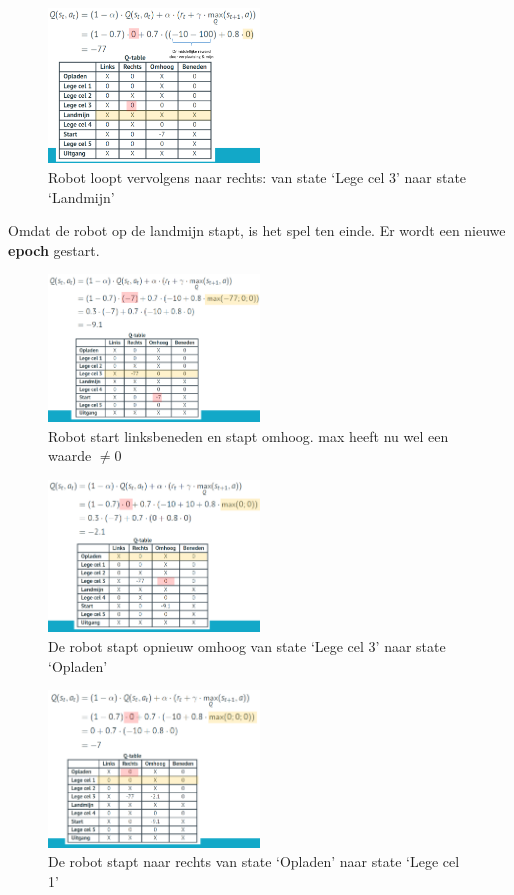 \documentclass{article}
\begin{document}
\begin{figure}[H]
    \centering
    \includegraphics[width=0.5\textwidth]{q-table4.png}
    \caption{Robot loopt vervolgens naar rechts: van state `Lege cel 3' naar state `Landmijn'}
\end{figure}

Omdat de robot op de landmijn stapt, is het spel ten einde. Er wordt een nieuwe \textbf{epoch} gestart.

\begin{figure}[H]
    \centering
    \includegraphics[width=0.5\textwidth]{q-table5.png}
    \caption{Robot start linksbeneden en stapt omhoog. max heeft nu wel een waarde $\neq 0$}
\end{figure}

\begin{figure}[H]
    \centering
    \includegraphics[width=0.5\textwidth]{q-table6.png}
    \caption{De robot stapt opnieuw omhoog van state `Lege cel 3' naar state `Opladen'}
\end{figure}

\begin{figure}[H]
    \centering
    \includegraphics[width=0.5\textwidth]{q-table7.png}
    \caption{De robot stapt naar rechts van state `Opladen' naar state `Lege cel 1'}
\end{figure}
\end{document}
